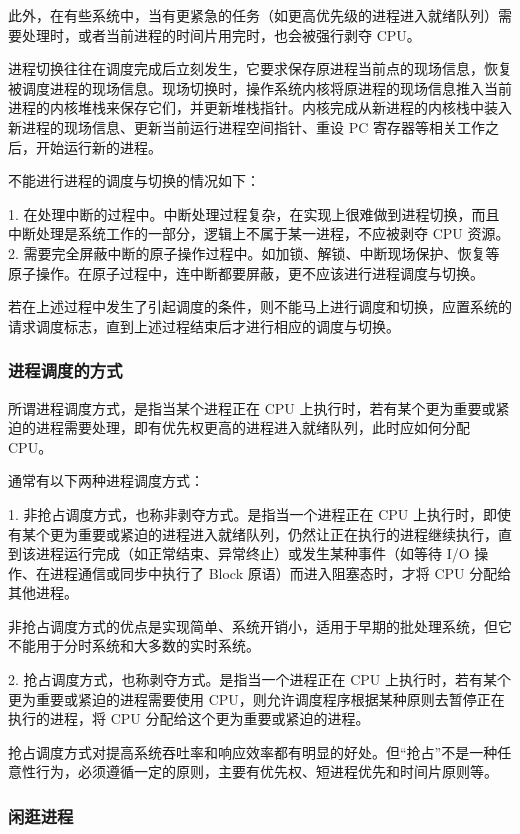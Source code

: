 \documentclass{ctexbook}
\begin{document}
	此外，在有些系统中，当有更紧急的任务（如更高优先级的进程进入就绪队列）需要处理时，或者当前进程的时间片用完时，也会被强行剥夺 CPU。
	
	进程切换往往在调度完成后立刻发生，它要求保存原进程当前点的现场信息，恢复被调度进程的现场信息。现场切换时，操作系统内核将原进程的现场信息推入当前进程的内核堆栈来保存它们，并更新堆栈指针。内核完成从新进程的内核栈中装入新进程的现场信息、更新当前运行进程空间指针、重设 PC 寄存器等相关工作之后，开始运行新的进程。
	
	不能进行进程的调度与切换的情况如下：
	
	1. 在处理中断的过程中。中断处理过程复杂，在实现上很难做到进程切换，而且中断处理是系统工作的一部分，逻辑上不属于某一进程，不应被剥夺 CPU 资源。
	2. 需要完全屏蔽中断的原子操作过程中。如加锁、解锁、中断现场保护、恢复等原子操作。在原子过程中，连中断都要屏蔽，更不应该进行进程调度与切换。
	
	若在上述过程中发生了引起调度的条件，则不能马上进行调度和切换，应置系统的请求调度标志，直到上述过程结束后才进行相应的调度与切换。
	
	\subsubsection{进程调度的方式}
	
	所谓进程调度方式，是指当某个进程正在 CPU 上执行时，若有某个更为重要或紧迫的进程需要处理，即有优先权更高的进程进入就绪队列，此时应如何分配 CPU。
	
	通常有以下两种进程调度方式：
	
	1. 非抢占调度方式，也称非剥夺方式。是指当一个进程正在 CPU 上执行时，即使有某个更为重要或紧迫的进程进入就绪队列，仍然让正在执行的进程继续执行，直到该进程运行完成（如正常结束、异常终止）或发生某种事件（如等待 I/O 操作、在进程通信或同步中执行了 Block 原语）而进入阻塞态时，才将 CPU 分配给其他进程。
	
	非抢占调度方式的优点是实现简单、系统开销小，适用于早期的批处理系统，但它不能用于分时系统和大多数的实时系统。
	
	2. 抢占调度方式，也称剥夺方式。是指当一个进程正在 CPU 上执行时，若有某个更为重要或紧迫的进程需要使用 CPU，则允许调度程序根据某种原则去暂停正在执行的进程，将 CPU 分配给这个更为重要或紧迫的进程。
	
	抢占调度方式对提高系统吞吐率和响应效率都有明显的好处。但“抢占”不是一种任意性行为，必须遵循一定的原则，主要有优先权、短进程优先和时间片原则等。
	
	\subsubsection{闲逛进程}
	
\end{document}
